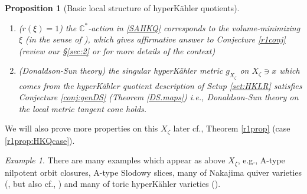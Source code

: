 \documentclass[12pt,a4paper]{amsart}
\newtheorem{Prop}[Thm]{Proposition}
\theoremstyle{remark}
\newtheorem{ex}[Thm]{Example}
\theoremstyle{definition}
\def\C{\mathbb{C}}
\begin{document}
\begin{Prop}[Basic local structure of hyperK\"ahler quotients]
\begin{enumerate}
    a conical symplectic variety 
    with a standard $\C^*$-action
    \item ($r(\xi)=1$) \label{R1HKQ} the $\C^*$-action in \eqref{SAHKQ} 
    corresponds to the volume-minimizing $\xi$ (in the sense of 
    \cite{MSY2, Li}), which gives affirmative answer to 
 Conjecture \ref{r1conj} (review our \S \ref{sec:2} or \cite[\S 2]{Od24a} 
 for more details of the context) 
\item \label{DSHKQiii} (Donaldson-Sun theory) 
the singular hyperK\"ahler metric $g_{X_\zeta}$ 
on $X_\zeta\ni x$ 
which comes from the 
hyperK\"ahler quotient description of Setup \ref{set:HKLR} 
satisfies 
Conjecture \ref{conj:genDS} (Theorem \ref{DS.maps}) 
i.e., Donaldson-Sun theory \cite{DSII} on the local metric tangent cone 
holds. 
\end{enumerate}
\end{Prop}

We will also prove more properties on this $X_\zeta$ later cf., 
Theorem \ref{r1prop} (case \eqref{r1prop:HKQcase}). 

\begin{ex}
There are many 
examples which appear as above $X_\zeta$, e.g.,  
A-type nilpotent orbit closures, A-type Slodowy slices, 
many of Nakajima quiver varieties (\cite{KobSwann}, \cite{Nakajima} but 
also cf., \cite{BS}) 
and many of 
toric hyperK\"ahler varieties (\cite{Goto, BD, HSt}). 
\end{ex}
\end{document}
